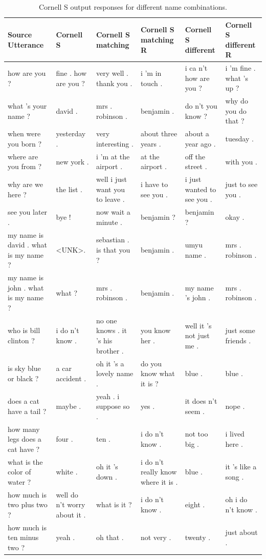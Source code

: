 \documentclass[12pt]{article}
\begin{document}
\begin{table}[H]
	\centering
	\begin{tabular}{|L{2.3cm}|L{2.3cm}|L{2.3cm}|L{2.3cm}|L{2.3cm}|L{2.3cm}|}
		\hline
		\textbf{Source Utterance} & \textbf{Cornell S} & \textbf{Cornell S matching} & \textbf{Cornell S matching R} & \textbf{Cornell S different} & \textbf{Cornell S different R}\\ \hline
		how are you ? & fine . how are you ? & very well . thank you . & i 'm in touch . & i ca n't how are you ? & i 'm fine . what 's up ?
		\\ \hline
		what 's your name ? & david . & mrs . robinson . & benjamin . & do n't you know ? & why do you do that ?
		\\ \hline
		when were you born ? & yesterday . & very interesting . & about three years . & about a year ago . & tuesday .
		\\ \hline
		where are you from ? & new york . & i 'm at the airport . & at the airport . & off the street . & with you .
		\\ \hline
		why are we here ? & the list . & well i just want you to leave . & i have to see you . & i just wanted to see you . & just to see you .
		\\ \hline
		see you later . & bye ! & now wait a minute . & benjamin ? & benjamin ? & okay .
		\\ \hline
		my name is david . what is my name ? & \textless UNK\textgreater . & sebastian . is that you ? & benjamin . & umyu name . & mrs . robinson .
		\\ \hline
		my name is john . what is my name ? & what ? & mrs . robinson . & benjamin . & my name 's john . & mrs . robinson .
		\\ \hline
		who is bill clinton ? & i do n't know . & no one knows . it 's his brother . & you know her . & well it 's not just me . & just some friends .
		\\ \hline
		is sky blue or black ? & a car accident . & oh it 's a lovely name . & do you know what it is ? & blue . & blue .
		\\ \hline
		does a cat have a tail ? & maybe . & yeah . i suppose so . & yes . & it does n't seem . & nope .
		\\ \hline
		how many legs does a cat have ? & four . & ten . & i do n't know . & not too big . & i lived here .
		\\ \hline
		what is the color of water ? & white . & oh it 's down . & i do n't really know where it is . & blue . & it 's like a song .
		\\ \hline
		how much is two plus two ? & well do n't worry about it . & what is it ? & i do n't know . & eight . & oh i do n't know .
		\\ \hline
		how much is ten minus two ? & yeah . & oh that . & not very . & twenty . & just about .
		\\ \hline
		
	\end{tabular}
	\caption{Cornell S output responses for different name combinations.}	
	\label{table:CornellS1}
\end{table}
\end{document}
